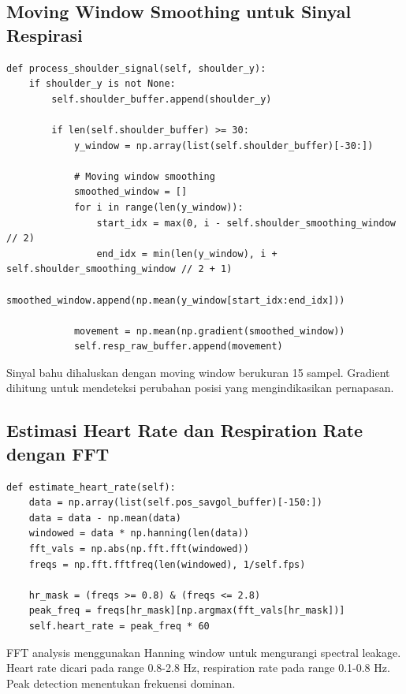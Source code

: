 \documentclass[11pt,a4paper]{article}
\begin{document}
\subsection{Moving Window Smoothing untuk Sinyal Respirasi}
    \begin{lstlisting}
def process_shoulder_signal(self, shoulder_y):
    if shoulder_y is not None:
        self.shoulder_buffer.append(shoulder_y)
        
        if len(self.shoulder_buffer) >= 30:
            y_window = np.array(list(self.shoulder_buffer)[-30:])
            
            # Moving window smoothing
            smoothed_window = []
            for i in range(len(y_window)):
                start_idx = max(0, i - self.shoulder_smoothing_window // 2)
                end_idx = min(len(y_window), i + self.shoulder_smoothing_window // 2 + 1)
                smoothed_window.append(np.mean(y_window[start_idx:end_idx]))
            
            movement = np.mean(np.gradient(smoothed_window))
            self.resp_raw_buffer.append(movement)
    \end{lstlisting}
    Sinyal bahu dihaluskan dengan moving window berukuran 15 sampel. Gradient dihitung untuk mendeteksi perubahan posisi yang mengindikasikan pernapasan.

\subsection{Estimasi Heart Rate dan Respiration Rate dengan FFT}
    \begin{lstlisting}
def estimate_heart_rate(self):
    data = np.array(list(self.pos_savgol_buffer)[-150:])
    data = data - np.mean(data)
    windowed = data * np.hanning(len(data))
    fft_vals = np.abs(np.fft.fft(windowed))
    freqs = np.fft.fftfreq(len(windowed), 1/self.fps)
    
    hr_mask = (freqs >= 0.8) & (freqs <= 2.8)
    peak_freq = freqs[hr_mask][np.argmax(fft_vals[hr_mask])]
    self.heart_rate = peak_freq * 60
    \end{lstlisting}
    FFT analysis menggunakan Hanning window untuk mengurangi spectral leakage. Heart rate dicari pada range 0.8-2.8 Hz, respiration rate pada range 0.1-0.8 Hz. Peak detection menentukan frekuensi dominan.
\end{document}
